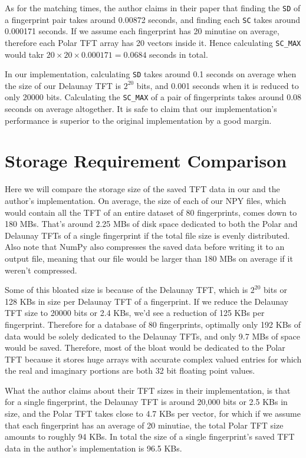 \documentclass[fyp]{socreport}
\begin{document}
As for the matching times, the author claims in their paper that finding the \texttt{SD} of a fingerprint pair takes around 0.00872 seconds, and finding each \texttt{SC} takes around 0.000171 seconds. If we assume each fingerprint has 20 minutiae on average, therefore each Polar TFT array has 20 vectors inside it. Hence calculating \texttt{SC\_MAX} would takr $20 \times 20 \times 0.000171 = 0.0684$ seconds in total.

In our implementation, calculating \texttt{SD} takes around 0.1 seconds on average when the size of our Delaunay TFT is $2^{20}$ bits, and 0.001 seconds when it is reduced to only 20000 bits. Calculating the \texttt{SC\_MAX} of a pair of fingerprints takes around 0.08 seconds on average altogether. It is safe to claim that our implementation's performance is superior to the original implementation by a good margin.

\section{Storage Requirement Comparison}
Here we will compare the storage size of the saved TFT data in our and the author's implementation. On average, the size of each of our NPY files, which would contain all the TFT of an entire dataset of 80 fingerprints, comes down to 180 MBs. That's around 2.25 MBs of disk space dedicated to both the Polar and Delaunay TFTs of a single fingerprint if the total file size is evenly distributed. Also note that NumPy also compresses the saved data before writing it to an output file, meaning that our file would be larger than 180 MBs on average if it weren't compressed. 

Some of this bloated size is because of the Delaunay TFT, which is $2^{20}$ bits or 128 KBs in size per Delaunay TFT of a fingerprint. If we reduce the Delaunay TFT size to 20000 bits or 2.4 KBs, we'd see a reduction of 125 KBs per fingerprint. Therefore for a database of 80 fingerprints, optimally only 192 KBs of data would be solely dedicated to the Delaunay TFTs, and only 9.7 MBs of space would be saved. Therefore, most of the bloat would be dedicated to the Polar TFT because it stores huge arrays with accurate complex valued entries for which the real and imaginary portions are both 32 bit floating point values.

What the author claims about their TFT sizes in their implementation, is that for a single fingerprint, the Delaunay TFT is around 20,000 bits or 2.5 KBs in size, and the Polar TFT takes close to 4.7 KBs per vector, for which if we assume that each fingerprint has an average of 20 minutiae, the total Polar TFT size amounts to roughly 94 KBs. In total the size of a single fingerprint's saved TFT data in the author's implementation is 96.5 KBs.
\end{document}
